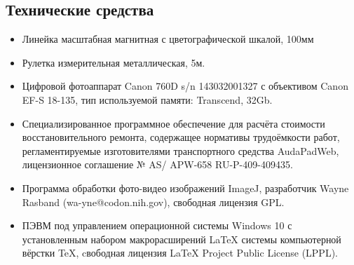\subsection{Технические средства}  %
%
\begin{itemize}
%
\item  Линейка масштабная магнитная с цветографической шкалой, 100мм
\item  Рулетка измерительная металлическая, 5м.
\item Цифровой фотоаппарат Canon 760D s/n 143032001327 с объективом Canon EF-S 18-135, тип используемой памяти: Transcend,  32Gb.
%
\item Специализированное программное обеспечение для расчёта стоимости  восстановительного ремонта, содержащее нормативы трудоёмкости работ, регламентируемые изготовителями транспортного средства     AudaPadWeb, лицензионное соглашение № AS/\- APW-658  RU-P-409-409435.
%
\item  Программа обработки фото-видео изображений ImageJ, разработчик  Wayne Rasband (wa-yne@codon.nih.gov),
свободная лицензия GPL.
%
\item  ПЭВМ под управлением операционной системы Windows 10 с установленным набором макрорасширений LaTeX системы компьютерной вёрстки TeX, cвободная лицензия LaTeX Project Public License (LPPL). 
%	
	\end{itemize}
